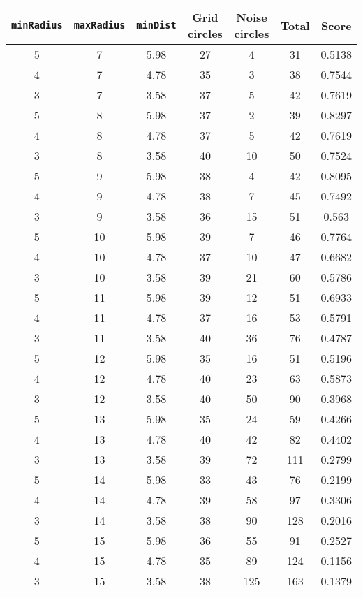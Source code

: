 \documentclass[letterpaper, 12pt]{article}
\begin{document}
\begin{longtable}{|c|c|c|c|c|c|c|}
\hline
\textbf{\texttt{minRadius}} & \textbf{\texttt{maxRadius}} & \textbf{\texttt{minDist}} & \textbf{Grid circles} & \textbf{Noise circles} & \textbf{Total} & \textbf{Score} \\
\hline
5 & 7 & 5.98 & 27 & 4 & 31 & 0.5138 \\
\hline
4 & 7 & 4.78 & 35 & 3 & 38 & 0.7544 \\
\hline
3 & 7 & 3.58 & 37 & 5 & 42 & 0.7619 \\
\hline
5 & 8 & 5.98 & 37 & 2 & 39 & 0.8297 \\
\hline
4 & 8 & 4.78 & 37 & 5 & 42 & 0.7619 \\
\hline
3 & 8 & 3.58 & 40 & 10 & 50 & 0.7524 \\
\hline
5 & 9 & 5.98 & 38 & 4 & 42 & 0.8095 \\
\hline
4 & 9 & 4.78 & 38 & 7 & 45 & 0.7492 \\
\hline
3 & 9 & 3.58 & 36 & 15 & 51 & 0.563 \\
\hline
5 & 10 & 5.98 & 39 & 7 & 46 & 0.7764 \\
\hline
4 & 10 & 4.78 & 37 & 10 & 47 & 0.6682 \\
\hline
3 & 10 & 3.58 & 39 & 21 & 60 & 0.5786 \\
\hline
5 & 11 & 5.98 & 39 & 12 & 51 & 0.6933 \\
\hline
4 & 11 & 4.78 & 37 & 16 & 53 & 0.5791 \\
\hline
3 & 11 & 3.58 & 40 & 36 & 76 & 0.4787 \\
\hline
5 & 12 & 5.98 & 35 & 16 & 51 & 0.5196 \\
\hline
4 & 12 & 4.78 & 40 & 23 & 63 & 0.5873 \\
\hline
3 & 12 & 3.58 & 40 & 50 & 90 & 0.3968 \\
\hline
5 & 13 & 5.98 & 35 & 24 & 59 & 0.4266 \\
\hline
4 & 13 & 4.78 & 40 & 42 & 82 & 0.4402 \\
\hline
3 & 13 & 3.58 & 39 & 72 & 111 & 0.2799 \\
\hline
5 & 14 & 5.98 & 33 & 43 & 76 & 0.2199 \\
\hline
4 & 14 & 4.78 & 39 & 58 & 97 & 0.3306 \\
\hline
3 & 14 & 3.58 & 38 & 90 & 128 & 0.2016 \\
\hline
5 & 15 & 5.98 & 36 & 55 & 91 & 0.2527 \\
\hline
4 & 15 & 4.78 & 35 & 89 & 124 & 0.1156 \\
\hline
3 & 15 & 3.58 & 38 & 125 & 163 & 0.1379 \\

\end{longtable}
\end{document}
